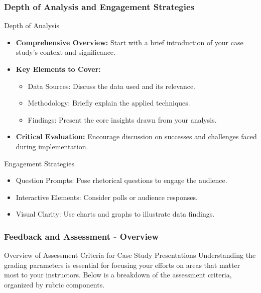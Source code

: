 \documentclass[aspectratio=169]{beamer}
\begin{document}
\begin{frame}[fragile]
    \frametitle{Depth of Analysis and Engagement Strategies}
    \begin{block}{Depth of Analysis}
        \begin{itemize}
            \item \textbf{Comprehensive Overview:} Start with a brief introduction of your case study's context and significance.
            \item \textbf{Key Elements to Cover:}
            \begin{itemize}
                \item Data Sources: Discuss the data used and its relevance.
                \item Methodology: Briefly explain the applied techniques.
                \item Findings: Present the core insights drawn from your analysis.
            \end{itemize}
            \item \textbf{Critical Evaluation:} Encourage discussion on successes and challenges faced during implementation.
        \end{itemize}
    \end{block}
    
    \begin{block}{Engagement Strategies}
        \begin{itemize}
            \item Question Prompts: Pose rhetorical questions to engage the audience.
            \item Interactive Elements: Consider polls or audience responses.
            \item Visual Clarity: Use charts and graphs to illustrate data findings.
        \end{itemize}
    \end{block}
\end{frame}

\begin{frame}[fragile]
    \frametitle{Feedback and Assessment - Overview}
    \begin{block}{Overview of Assessment Criteria for Case Study Presentations}
        Understanding the grading parameters is essential for focusing your efforts on areas that matter most to your instructors. Below is a breakdown of the assessment criteria, organized by rubric components.
    \end{block}
\end{frame}
\end{document}
